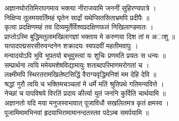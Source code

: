 अज्ञानघोरतिमिरापगमाय भक्त्या नीराजयामि जननीं सुहिरण्यपात्रे ।\\
निक्षिप्य तूलमयवर्तिमहं घृतेन सार्द्रां यथेप्सितसिताभ्रमपि प्रदीपैः ॥\\[10pt]

कृत्वा प्रदक्षिणमहं तव दिव्यमूर्तेर्विश्वप्रदक्षिणफलं निखिलाण्डमातः ।\\
प्राप्तोऽस्मि बुद्धिमतुलामखिलागज्ञां भक्ताय मे करुणया दिश तां म अाशु ॥\\[10pt]

यत्पादपद्मसरसीरुवन्दनेन शक्रादयः स्वपदवीं महतीमवापुः ।\\
मन्वादयोऽपि भुवि भूपतयो बभूवुस्त्वां यः शुचिः प्रणमति प्रयतः स धन्यः ॥\\[10pt]

सम्प्रार्थना त्वयि ममेयमशेषविद्यामायुः शताब्दपरिमाणमरोगतां च ।\\
लक्ष्मीमपि स्थिरतरामखिलेष्टसिद्धिं वैराग्यवृद्धिमनिशं मम देहि देवि ॥\\[10pt]

श्रद्धां गुरौ त्वयि च भक्तिमचञ्चलां मे धर्मे मतिं श्रुतिपथे गतिमन्यवित्ते ।\\
नेच्छां च पापविषये विरतिं प्रदाय कीर्त्या युतं जननि कुर्विति चार्थयामि ॥\\[10pt]

अज्ञानतो यदि मया मनुजस्वभावात् पूजाविधौ सखलितमत्र कृतं क्षमस्व ।\\
पूजामिमामभिनवां हृदयाभिरामामानन्दतस्तव पदेऽम्ब समर्पयामि ॥\\[10pt]

